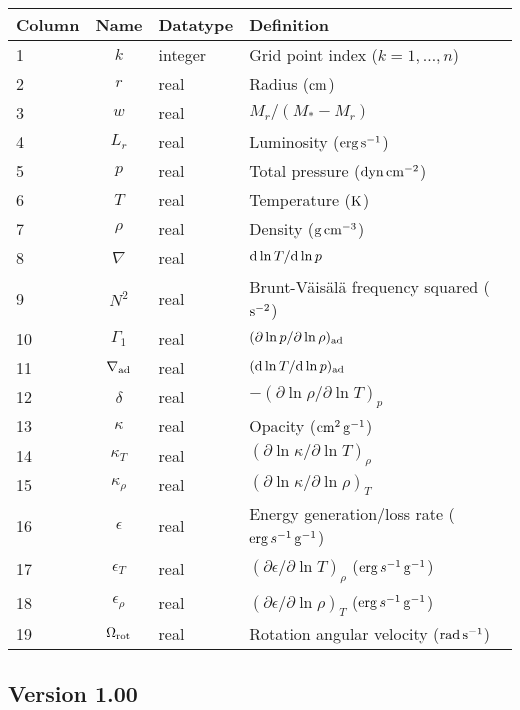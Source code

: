 \documentclass{article}
\newcommand{\diff}{\ensuremath{{\rm d}}}
\newcommand{\Mstar}{\ensuremath{M_{\ast}}}
\newcommand{\cm}{\ensuremath{{\rm cm}}}
\newcommand{\gram}{\ensuremath{{\rm g}}}
\newcommand{\second}{\ensuremath{{\rm s}}}
\newcommand{\dyne}{\ensuremath{{\rm dyn}}}
\newcommand{\erg}{\ensuremath{{\rm erg}}}
\newcommand{\kelvin}{\ensuremath{{\rm K}}}
\begin{document}
\begin{table}[h!]
\begin{tabular}{|l|c|l|l|} \hline
Column & Name & Datatype & Definition \\ \hline
1      & $k$ & integer & Grid point index ($k=1,\ldots,n$) \\
2      & $r$ & real    & Radius ($\cm$) \\
3      & $w$ & real    & $M_{r}/(\Mstar-M_{r})$ \\
4      & $L_{r}$ & real & Luminosity ($\erg\,\second^{-1}$) \\
5      & $p$ & real    & Total pressure ($\dyne\,\cm^{-2}$) \\
6      & $T$ & real    & Temperature ($\kelvin$) \\
7      & $\rho$ & real & Density ($\gram\,\cm^{-3}$) \\
8      & $\nabla$ & real & $\diff \ln T/\diff \ln p$ \\
9      & $N^{2}$ & real & Brunt-V\"ais\"al\"a frequency squared ($\second^{-2}$) \\
10     & $\Gamma_{1}$ & real & $(\partial \ln p/\partial \ln \rho)_{\rm ad}$ \\
11     & $\nabla_{\rm ad}$ & real & $(\diff \ln T/\diff \ln p)_{\rm ad}$ \\
12     & $\delta$ & real & $-(\partial \ln \rho/\partial \ln T)_{p}$  \\
13     & $\kappa$ & real & Opacity ($\cm^{2}\,\gram^{-1}$) \\
14     & $\kappa_{T}$ & real & $(\partial \ln \kappa/\partial \ln T)_{\rho}$ \\
15     & $\kappa_{\rho}$ & real & $(\partial \ln \kappa/\partial \ln \rho)_{T}$ \\
16     & $\epsilon$ & real & Energy generation/loss rate ($\erg\,s^{-1}\,\gram^{-1}$) \\
17     & $\epsilon_{T}$ & real & $(\partial \epsilon/\partial \ln T)_{\rho}$ ($\erg\,s^{-1}\,\gram^{-1}$) \\
18     & $\epsilon_{\rho}$ & real & $(\partial \epsilon/\partial \ln \rho)_{T}$ ($\erg\,s^{-1}\,\gram^{-1}$) \\
19     & $\Omega_{\rm rot}$ & real & Rotation angular velocity (${\rm rad}\,\second^{-1}$) \\  \hline
\end{tabular}
\end{table}

\subsection*{Version 1.00}
\end{document}
